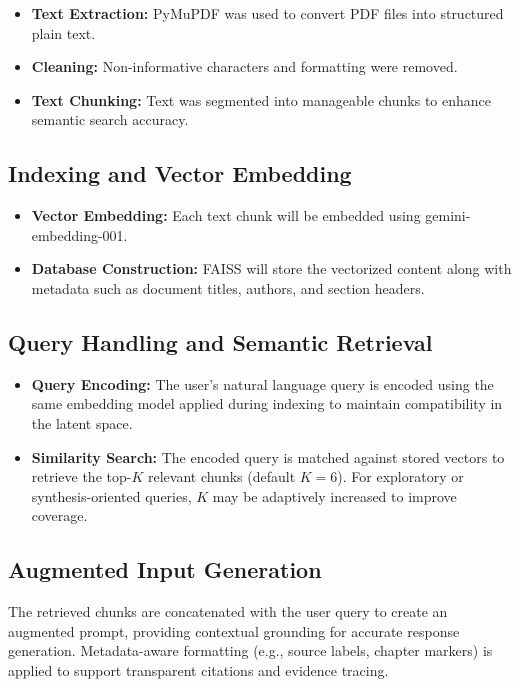 \begin{refsection}
\begin{itemize}
    \item \textbf{Text Extraction:} PyMuPDF was used to convert PDF files into structured plain text.
    \item \textbf{Cleaning:} Non-informative characters and formatting were removed.
    \item \textbf{Text Chunking:} Text was segmented into manageable chunks to enhance semantic search accuracy.
\end{itemize}

\subsection*{Indexing and Vector Embedding}

\begin{itemize}
    \item \textbf{Vector Embedding:} Each text chunk will be embedded using gemini-embedding-001.
    \item \textbf{Database Construction:} FAISS will store the vectorized content along with metadata such as document titles, authors, and section headers.
\end{itemize}

\subsection*{Query Handling and Semantic Retrieval}

\begin{itemize}
    \item \textbf{Query Encoding:} The user’s natural language query is encoded using the same embedding model applied during indexing to maintain compatibility in the latent space.
    \item \textbf{Similarity Search:} The encoded query is matched against stored vectors to retrieve the top-$K$ relevant chunks (default $K=6$). For exploratory or synthesis-oriented queries, $K$ may be adaptively increased to improve coverage.
\end{itemize}

\subsection*{Augmented Input Generation}

The retrieved chunks are concatenated with the user query to create an augmented prompt, providing contextual grounding for accurate response generation. Metadata-aware formatting (e.g., source labels, chapter markers) is applied to support transparent citations and evidence tracing.


\end{refsection}
